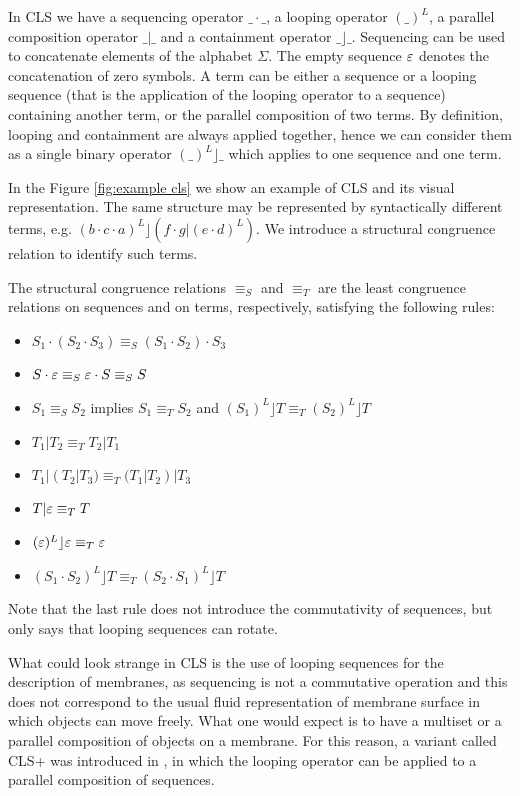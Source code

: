 In CLS we have a sequencing operator $\_\cdot\_$, a looping operator $(\_)^L$, a parallel composition operator $\_|\_$ and a containment operator $\_\rfloor\_$. Sequencing can be used to concatenate elements of the alphabet $\Sigma$. The empty sequence $\varepsilon$ denotes the concatenation of zero symbols. A term can be either a sequence or a looping sequence (that is the application of the looping operator to a sequence) containing another term, or the parallel composition of two terms. By definition, looping and containment are always applied together, hence we can consider them as a single binary operator $(\_)^L\rfloor\_$ which applies to one sequence and one term.

\begin{example}
  In the Figure \ref{fig:example cls} we show an example of CLS and its visual representation. The same structure may be represented by syntactically different terms, e.g. $(b\cdot c\cdot a)^L\rfloor (f\cdot g | (e\cdot d)^L)$. We introduce a structural congruence relation to identify such terms.
\end{example}

\begin{definition}
  The structural congruence relations $\equiv_S$ and $\equiv_T$ are the least congruence relations on sequences and on terms, respectively, satisfying the following rules:
  \begin{itemize}
    \item $S_1\cdot(S_2\cdot S_3)\equiv_S (S_1\cdot S_2)\cdot S_3$
    \item $S\cdot\varepsilon\equiv_S \varepsilon\cdot S\equiv_S S$
    \item $S_1\equiv_S S_2$ implies $S_1\equiv_T S_2$ and $(S_1)^L\rfloor T\equiv_T (S_2)^L\rfloor T$
    \item $T_1|T_2\equiv_T T_2|T_1$
    \item $T_1|(T_2|T_3)\equiv_T (T_1|T_2)|T_3$
    \item $T|\varepsilon\equiv_T T$
    \item $(\varepsilon)^L\rfloor\varepsilon\equiv_T\varepsilon$
    \item $(S_1\cdot S_2)^L\rfloor T\equiv_T (S_2\cdot S_1)^L\rfloor T$
  \end{itemize}
\end{definition}

Note that the last rule does not introduce the commutativity of sequences, but only says that looping sequences can rotate.

What could look strange in CLS is the use of looping sequences for the description of membranes, as sequencing is not a commutative operation and this does not correspond to the usual fluid representation of membrane surface in which objects can move freely. What one would expect is to have a multiset or a parallel composition of objects on a membrane. For this reason, a variant called CLS+ was introduced in \cite{Milazzo07CLS}, in which the looping operator can be applied
to a parallel composition of sequences.

